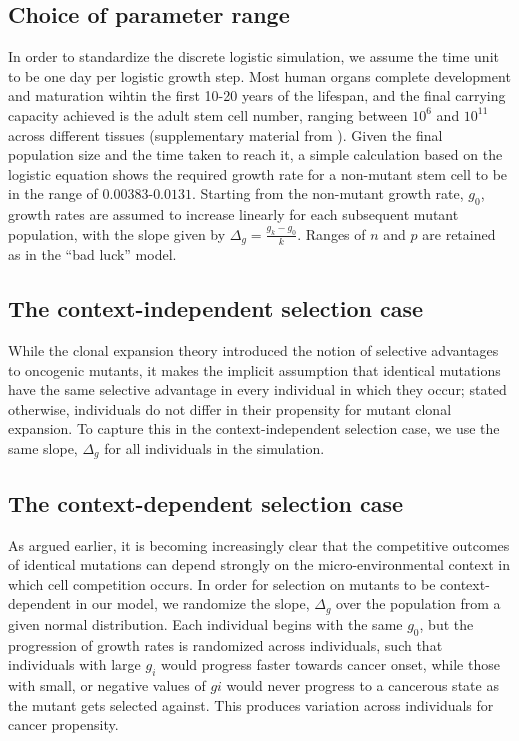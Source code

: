 \documentclass[12pt,onecolumn,twoside]{article}
\begin{document}
	\subsection{Choice of parameter range}
	In order to standardize the discrete logistic simulation, we assume the time unit to be one day per logistic growth step. Most human organs complete development and maturation wihtin the first 10-20 years of the lifespan, and the final carrying capacity achieved is the adult stem cell number, ranging between $10^{6}$ and $10^{11}$ across different tissues (supplementary material from \autocite{Tomasetti78}). Given the final population size and the time taken to reach it, a simple calculation based on the logistic equation shows the required growth rate for a non-mutant stem cell to be in the range of $0.00383$-$0.0131$. Starting from the non-mutant growth rate, $g_{0}$, growth rates are assumed to increase linearly for each subsequent mutant population, with the slope given by $\Delta_{g}=\frac{g_{k}-g_{0}}{k}$. Ranges of $n$ and $p$ are retained as in the ``bad luck'' model.

	\subsection{The context-independent selection case}
	While the clonal expansion theory introduced the notion of selective advantages to oncogenic mutants, it makes the implicit assumption that identical mutations have the same selective advantage in every individual in which they occur; stated otherwise, individuals do not differ in their propensity for mutant clonal expansion. To capture this in the context-independent selection case, we use the same slope, $\Delta_{g}$ for all individuals in the simulation.

	\subsection{The context-dependent selection case}
	As argued earlier, it is becoming increasingly clear that the competitive outcomes of identical mutations can depend strongly on the micro-environmental context in which cell competition occurs. In order for selection on mutants to be context-dependent in our model, we randomize the slope, $\Delta_{g}$ over the population from a given normal distribution. Each individual begins with the same $g_{0}$, but the progression of growth rates is randomized across individuals, such that individuals with large $g_{i}$ would progress faster towards cancer onset, while those with small, or negative values of $g{i}$ would never progress to a cancerous state as the mutant gets selected against. This produces variation across individuals for cancer propensity.
\end{document}
